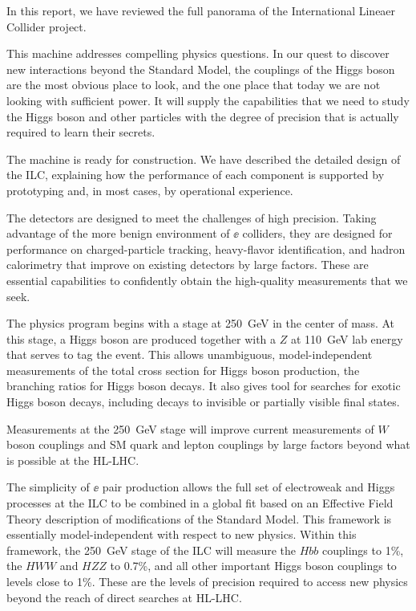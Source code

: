 
In this report, we have reviewed the full panorama of the
International Lineaer Collider project.   

This machine addresses
compelling physics questions.   In
our quest to discover new interactions beyond the Standard Model, the
couplings of the Higgs boson are the most obvious place to look, and
the one place that today we are not looking with sufficient power. 
 It will supply the capabilities that
we need to study the Higgs boson and other particles with the degree
of precision that is actually required to learn their secrets. 

The machine is ready for construction.   We have described the
detailed design of the ILC, explaining how the performance of  each
component
is supported by prototyping and, in most cases, by operational
experience.

The detectors are designed to meet the challenges of high precision.
Taking advantage of the more benign environment of $\ee$ colliders,
they are designed for performance on charged-particle tracking,
heavy-flavor identification, and hadron calorimetry that improve on
existing detectors by large factors.  These are essential capabilities
to confidently obtain the high-quality measurements that we seek.

The physics program begins with a stage at 250~GeV in the center of
mass.  At this stage, a Higgs boson are produced together with a $Z$
at 110~GeV lab energy that serves to tag the event.  This allows
unambiguous,
model-independent measurements of the total cross section for Higgs
boson production, the branching ratios for Higgs boson  decays.  It also gives
tool for searches for exotic Higgs boson decays, including decays to
invisible or partially visible final states.

Measurements at the 250~GeV stage will improve current
measurements of $W$ boson couplings and SM quark and lepton couplings
by large factors beyond what is possible at the HL-LHC.

The simplicity of $\ee$ pair production allows the full set of
electroweak and Higgs processes at the ILC to be combined in a global
fit based on an Effective Field Theory description of modifications of
the Standard Model.   This framework is essentially model-independent
with respect to new physics.  Within this framework, the 250~GeV stage
of the ILC will measure the $Hbb$ couplings to 1\%, the
$HWW$ and $HZZ$ to 0.7\%, and all other important Higgs boson
couplings to levels close to 1\%.   These are the levels of precision
required to access new physics beyond the reach of direct searches at HL-LHC.

